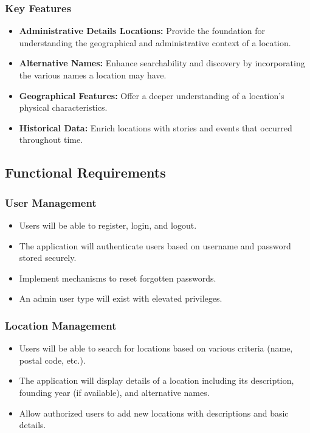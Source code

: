 \subsubsection{Key Features}
\begin{itemize}
    \item \textbf{Administrative Details Locations:} Provide the foundation for understanding the geographical and administrative context of a location.
    \item \textbf{Alternative Names:} Enhance searchability and discovery by incorporating the various names a location may have.
    \item \textbf{Geographical Features:} Offer a deeper understanding of a location’s physical characteristics.
    \item \textbf{Historical Data:} Enrich locations with stories and events that occurred throughout time.
\end{itemize}

\subsection{Functional Requirements}
\subsubsection{User Management}
\begin{itemize}
    \item Users will be able to register, login, and logout.
    \item The application will authenticate users based on username and password stored securely.
    \item Implement mechanisms to reset forgotten passwords.
    \item An admin user type will exist with elevated privileges.
\end{itemize}

\subsubsection{Location Management}
\begin{itemize}
    \item Users will be able to search for locations based on various criteria (name, postal code, etc.).
    \item The application will display details of a location including its description, founding year (if available), and alternative names.
    \item Allow authorized users to add new locations with descriptions and basic details.
\end{itemize}

